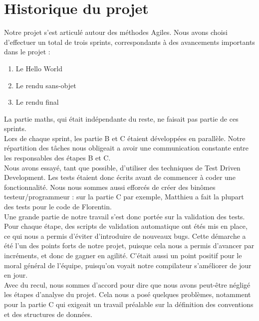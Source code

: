\documentclass{article}
\begin{document}
\section{Historique du projet} 
Notre projet s'est articulé autour des méthodes Agiles. Nous avons choisi d'effectuer un total de trois sprints, correspondants à des avancements importants dans le projet : 
\begin{enumerate}
    \item Le Hello World
    \item Le rendu sans-objet
    \item Le rendu final
\end{enumerate}
La partie maths, qui était indépendante du reste, ne faisait pas partie de ces sprints. \\
Lors de chaque sprint, les partie B et C étaient développées en parallèle. Notre répartition des tâches nous obligeait a avoir une communication constante entre les responsables des étapes B et C. \\
Nous avons essayé, tant que possible, d'utiliser des techniques de Test Driven Development. Les tests étaient donc écrits avant de commencer à coder une fonctionnalité. Nous nous sommes aussi efforcés de créer des binômes testeur/programmeur : sur la partie C par exemple, Matthieu a fait la plupart des tests pour le code de Florentin. \\
Une grande partie de notre travail s'est donc portée sur la validation des tests. Pour chaque étape, des scripts de validation automatique ont étés mis en place, ce qui nous a permis d'éviter d'introduire de nouveaux bugs. Cette démarche a été l'un des points forts de notre projet, puisque cela nous a permis d'avancer par incréments, et donc de gagner en agilité. C'était aussi un point positif pour le moral général de l'équipe, puisqu'on voyait notre compilateur s'améliorer de jour en jour.\\
Avec du recul, nous sommes d'accord pour dire que nous avons peut-être négligé les étapes d'analyse du projet. Cela nous a posé quelques problèmes, notamment pour la partie C qui exigeait un travail préalable sur la définition des conventions et des structures de données. \\
\end{document}
